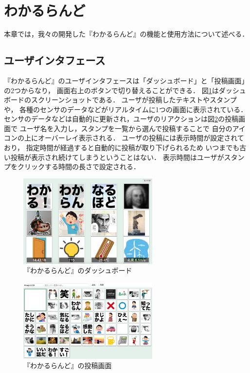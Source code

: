 \section{わかるらんど}
本章では，我々の開発した『わかるらんど』の機能と使用方法について述べる．

\subsection{ユーザインタフェース}

『わかるらんど』のユーザインタフェースは「ダッシュボード」と「投稿画面」の2つからなり，
画面右上のボタンで切り替えることができる．
図\ref{dashboard}はダッシュボードのスクリーンショットである．
ユーザが投稿したテキストやスタンプや，
各種のセンサのデータなどがリアルタイムに1つの画面に表示されている．
センサのデータなどは自動的に更新され，ユーザのリアクションは図\ref{console}の投稿画面で
ユーザ名を入力し，スタンプを一覧から選んで投稿することで
自分のアイコンの上にオーバーレイ表示される．
ユーザの投稿には表示時間が設定されており，
指定時間が経過すると自動的に投稿が取り下げられるため
いつまでも古い投稿が表示され続けてしまうということはない．
表示時間はユーザがスタンプをクリックする時間の長さで設定される．


\begin{figure}[h]
\centering
\includegraphics[width=7cm]{images/dashboard.png}
\caption{『わかるらんど』のダッシュボード}
\label{dashboard}
\end{figure}

\begin{figure}[h]
\centering
\includegraphics[width=7cm]{images/console.png}
\caption{『わかるらんど』の投稿画面}
\label{console}
\end{figure}

